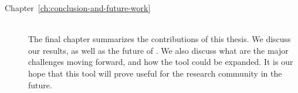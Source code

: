 \begin{description}
    \item[Chapter~\ref{ch:conclusion-and-future-work}] \hfill \\

        The final chapter summarizes the contributions of this thesis.
        We discuss our results, as well as the future of \demo. We also
        discuss what are the major challenges moving forward, and how
        the tool could be expanded. It is our hope that this tool will
        prove useful for the research community in the future.


\end{description}
